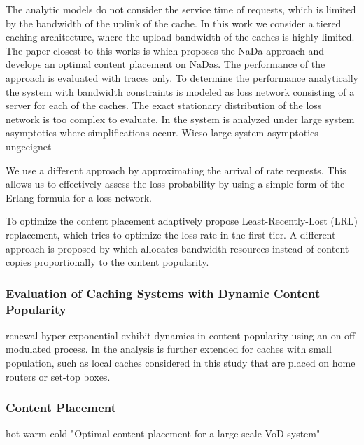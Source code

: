 The analytic models do not consider the service time of requests, which is limited by the bandwidth of the uplink of the cache.
In this work we consider a tiered caching architecture, where the upload bandwidth of the caches is highly limited.
The paper closest to this works is \cite{valancius2009greening} which proposes the NaDa approach and develops an optimal content placement on NaDas.
The performance of the approach is evaluated with traces only.
To determine the performance analytically the system with bandwidth constraints is modeled as loss network consisting of a server for each of the caches. The exact stationary distribution of the loss network is too complex to evaluate.
In \cite{tan2013optimal} the system is analyzed under large system asymptotics where simplifications occur.
Wieso large system asymptotics ungeeignet

We use a different approach by approximating the arrival of rate requests.
This allows us to effectively assess the loss probability by using a simple form of the Erlang formula for a loss network.

To optimize the content placement adaptively \cite{leconte2014adaptive} propose Least-Recently-Lost (LRL) replacement, which tries to optimize the loss rate in the first tier.
A different approach is proposed by \cite{zhou2015unifying} which allocates bandwidth resources instead of content copies proportionally to the content popularity.

\subsubsection{Evaluation of Caching Systems with Dynamic Content Popularity}

renewal hyper-exponential \cite{martina2014unified}
exhibit dynamics in content popularity \cite{garetto2014dynamic} using an on-off-modulated process.
In \cite{leconte2016dynamic} the analysis is further extended for caches with small population, such as local caches considered in this study that are placed on home routers or set-top boxes.

\subsubsection{Content Placement}
hot warm cold
"Optimal content placement for a large-scale VoD system"

